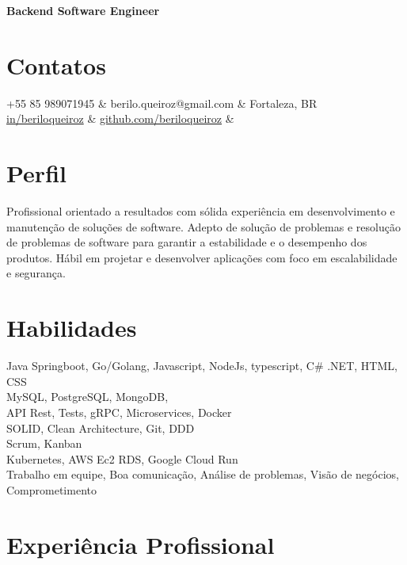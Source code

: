 \documentclass[11pt,a4paper,sans]{moderncv}
\begin{document}
\makecvtitle
\vspace*{-16mm}
\begin{center}\textbf{ Backend Software Engineer}\end{center}

\section{Contatos}{
  \begin{center}
	  \faMobile\enspace +55 85 989071945                                                                  & \enspace berilo.queiroz@gmail.com & \enspace\faHome\enspace Fortaleza, BR \\
	  \faLinkedin\enspace \color{blue} \href{https://www.linkedin.com/in/beriloqueiroz}{in/beriloqueiroz} &
	  \faGithub\enspace \color{blue} \href{https://github.com/beriloqueiroz}{github.com/beriloqueiroz}    & \enspace
  \end{center}
 }

\section{Perfil}
 {
  Profissional orientado a resultados com sólida experiência em desenvolvimento e manutenção de soluções de software. Adepto de solução de problemas e resolução de problemas de software para garantir a estabilidade e o desempenho dos produtos.
  Hábil em projetar e desenvolver aplicações com foco em escalabilidade e segurança.
 }

\section{Habilidades}
 {
  Java Springboot, Go/Golang, Javascript, NodeJs, typescript, C\# .NET, HTML, CSS \\
  MySQL, PostgreSQL, MongoDB, \\
  API Rest, Tests, gRPC, Microservices, Docker\\
  SOLID, Clean Architecture, Git, DDD \\
  Scrum, Kanban\\
  Kubernetes, AWS Ec2 RDS, Google Cloud Run\\
  Trabalho em equipe, Boa comunicação, Análise de problemas, Visão de negócios, Comprometimento\\
 }

\section{Experiência Profissional}
\end{document}

